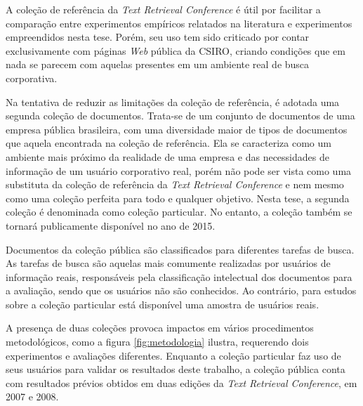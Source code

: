 A coleção de referência da \textit{Text Retrieval Conference} é útil por facilitar a comparação entre experimentos empíricos relatados na literatura e experimentos empreendidos nesta tese. Porém, seu uso tem sido criticado por contar exclusivamente com páginas \textit{Web} pública da CSIRO, criando condições que em nada se parecem com aquelas presentes em um ambiente real de busca corporativa. %

Na tentativa de reduzir as limitações da coleção de referência, é adotada uma segunda coleção de documentos. Trata-se de um conjunto de documentos de uma empresa pública brasileira, com uma diversidade maior de tipos de documentos que aquela encontrada na coleção de referência. Ela se caracteriza como um ambiente mais próximo da realidade de uma empresa e das necessidades de informação de um usuário corporativo real, porém não pode ser vista como uma substituta da coleção de referência da \textit{Text Retrieval Conference} e nem mesmo como uma coleção perfeita para todo e qualquer objetivo. Nesta tese, a segunda coleção é denominada como coleção particular. No entanto, a coleção também se tornará publicamente disponível no ano de 2015. %

Documentos da coleção pública são classificados para diferentes tarefas de busca. As tarefas de busca são aquelas mais comumente realizadas por usuários de informação reais, responsáveis pela classificação intelectual dos documentos para a avaliação, sendo que os usuários não são conhecidos. Ao contrário, para estudos sobre a coleção particular está disponível uma amostra de usuários reais.

A presença de duas coleções provoca impactos em vários procedimentos metodológicos, como a figura \ref{fig:metodologia} ilustra, requerendo dois experimentos e avaliações diferentes. Enquanto a coleção particular faz uso de seus usuários para validar os resultados deste trabalho, a coleção pública conta com resultados prévios obtidos em duas edições da \textit{Text Retrieval Conference}, em 2007 e 2008.


